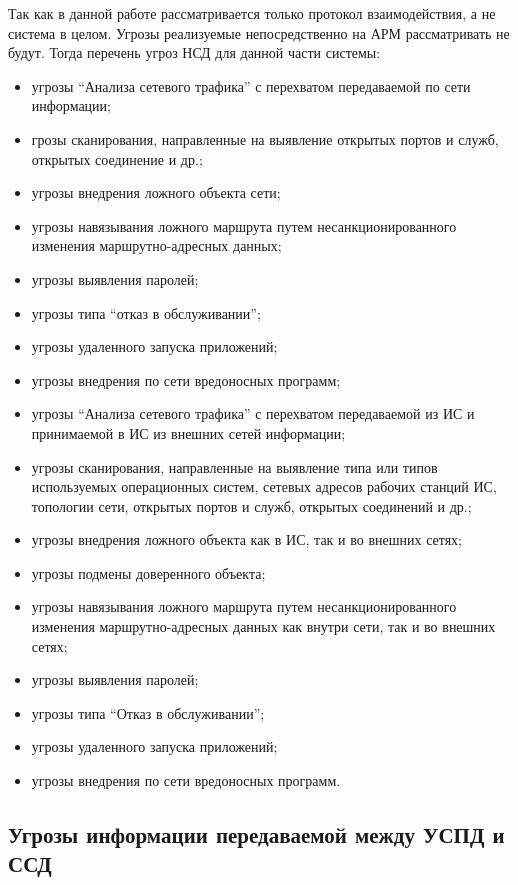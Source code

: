 Так как в данной работе рассматривается только протокол взаимодействия, а не система в целом. Угрозы реализуемые непосредственно на АРМ рассматривать не будут. Тогда перечень угроз НСД для данной части системы:

\begin{itemize}
 \item угрозы ``Анализа сетевого трафика'' с перехватом передаваемой по сети информации;
 \item грозы сканирования, направленные на выявление открытых портов и служб, открытых соединение и др.;
 \item угрозы внедрения ложного объекта сети;
 \item угрозы навязывания ложного маршрута путем несанкционированного изменения маршрутно-адресных данных;
 \item угрозы выявления паролей;
 \item угрозы типа ``отказ в обслуживании'';
 \item угрозы удаленного запуска приложений;
 \item угрозы внедрения по сети вредоносных программ;
 \item угрозы ``Анализа  сетевого  трафика'' с  перехватом  передаваемой из ИС и принимаемой в ИС из внешних сетей информации;
 \item угрозы  сканирования,  направленные  на  выявление типа  или  типов используемых операционных систем, сетевых адресов рабочих станций ИС, топологии сети, открытых портов и служб, открытых соединений и др.;
 \item угрозы внедрения ложного объекта как в ИС, так и во внешних сетях;
 \item угрозы подмены доверенного объекта;
 \item угрозы  навязывания  ложного  маршрута  путем  несанкционированного изменения  маршрутно-адресных  данных  как  внутри сети,  так  и  во внешних сетях;
 \item угрозы выявления паролей;
 \item угрозы типа ``Отказ в обслуживании'';
 \item угрозы удаленного запуска приложений;
 \item угрозы внедрения по сети вредоносных программ.
\end{itemize}

\subsection{Угрозы информации передаваемой между УСПД и ССД}

